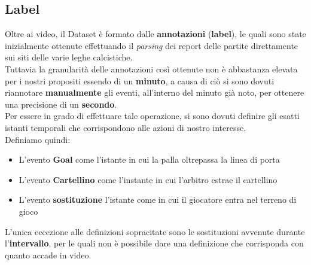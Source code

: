 \subsection{Label}
Oltre ai video, il Dataset è formato dalle \textbf{annotazioni} (\textbf{label}), le quali sono state inizialmente ottenute effettuando il \textit{parsing} dei report delle partite direttamente sui siti delle varie leghe calcistiche.
\\Tuttavia la granularità delle annotazioni così ottenute non è abbastanza elevata per i nostri propositi essendo di un \textbf{minuto}, a causa di ciò si sono dovuti riannotare \textbf{manualmente} gli eventi, all'interno del minuto già noto, per ottenere una precisione di un \textbf{secondo}.
\\Per essere in grado di effettuare tale operazione, si sono dovuti definire gli esatti istanti temporali che corrispondono alle azioni di nostro interesse.
\\Definiamo quindi:
\begin{itemize}
\item L'evento \textbf{Goal} come l'istante in cui la palla oltrepassa la linea di porta
\item L'evento \textbf{Cartellino} come l'instante in cui l'arbitro estrae il cartellino
\item L'evento \textbf{sostituzione} l'istante come in cui il giocatore entra nel terreno di gioco
\end{itemize}
L'unica eccezione alle definizioni sopracitate sono le sostituzioni avvenute durante l'\textbf{intervallo}, per le quali non è possibile dare una definizione che corrisponda con quanto accade in video.
